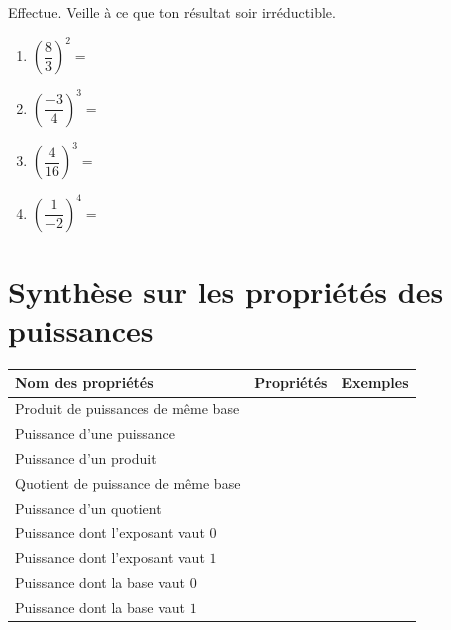 \documentclass[../math2.tex]{subfiles}
\begin{document}
\begin{center}
\end{center}

\begin{exercise}
	Effectue. Veille à ce que ton résultat soir irréductible.
	\begin{enumerate}[cols=2]
		\item $\left(\dfrac{8}{3}\right)^2=$
		\item $\left(\dfrac{-3}{4}\right)^3=$
		\item $\left(\dfrac{4}{16}\right)^3=$
		\item $\left(\dfrac{1}{-2}\right)^4=$
	\end{enumerate}
\end{exercise}

\section{Synthèse sur les propriétés des puissances}

 {\renewcommand{\arraystretch}{2}
  \begin{tabularx}{\linewidth}{|p{7cm}|X|X|}
	  \hline
	  \centering\textbf{Nom des propriétés} & \centering\textbf{Propriétés} & \centering\arraybackslash\textbf{Exemples} \\
	  \hline
	  Produit de puissances de même base    &                               &                                            \\
	  \hline
	  Puissance d'une puissance             &                               &                                            \\
	  \hline
	  Puissance d'un produit                &                               &                                            \\
	  \hline
	  Quotient de puissance de même base    &                               &                                            \\
	  \hline
	  Puissance d'un quotient               &                               &                                            \\
	  \hline
	  Puissance dont l'exposant vaut $0$    &                               &                                            \\
	  \hline
	  Puissance dont l'exposant vaut $1$    &                               &                                            \\
	  \hline
	  Puissance dont la base vaut $0$       &                               &                                            \\
	  \hline
	  Puissance dont la base vaut $1$       &                               &                                            \\
	  \hline
  \end{tabularx}}
\end{document}
